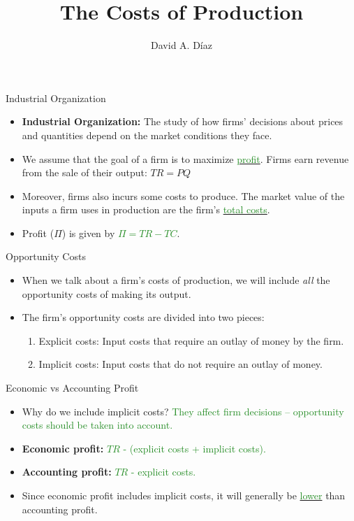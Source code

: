 \documentclass[xcolor={dvipsnames},pdf, hyperref={colorlinks=true, citecolor=ForestGreen, linkcolor=BlueViolet, urlcolor=Magenta}]{beamer}
\title{The Costs of Production}
\author{David A. D\'iaz}
\institute{UNC Chapel Hill}
\date{}
\newcommand{\defn}[1]{\textbf{#1}}
\newcommand{\ddp}[1]{{\textcolor{ForestGreen}{#1}}}
\newcommand{\dd}[1]{{\underline{\textcolor{ForestGreen}{#1}}}}
\begin{document}
 
	
	\begin{frame}
		
		\titlepage
		
	\end{frame}
	

\begin{frame}{Industrial Organization}

\begin{itemize}
	\item \defn{Industrial Organization:} The study of how firms' decisions about prices and quantities depend on the market conditions they face.
	\item We assume that the goal of a firm is to maximize \dd{profit}. Firms earn revenue from the sale of their output: $TR = PQ$ 
	\item Moreover, firms also incurs some costs to produce. The market value of the inputs a firm uses in production are the firm's \dd{total costs}.
	\item Profit ($\Pi$) is given by \dd{$\Pi = TR - TC$}.
\end{itemize}

\end{frame}

\begin{frame}{Opportunity Costs}
\begin{itemize}
	\item 	When we talk about a firm's costs of production, we will include \textit{all} the opportunity costs of making its output. 
	\item The firm's opportunity costs are divided into two pieces:
	\begin{enumerate}
		\itemsep1em 
		\item Explicit costs: Input costs that require an outlay of money by the firm.
		\item Implicit costs: Input costs that do not require an outlay of money.
	\end{enumerate}
\end{itemize}
\end{frame}

\begin{frame}{Economic vs Accounting Profit}
\begin{itemize}
	\item 	Why do we include implicit costs? \ddp{They affect firm decisions -- opportunity costs should be taken into account.}
	\item \defn{Economic profit:} \ddp{$TR$ - (explicit costs + implicit costs). \\}
	\item \defn{Accounting profit:} \ddp{$TR$ - explicit costs.\\}
	\item Since economic profit includes implicit costs, it will generally be \dd{lower} than accounting profit.
\end{itemize}
\end{frame}
\end{document}
